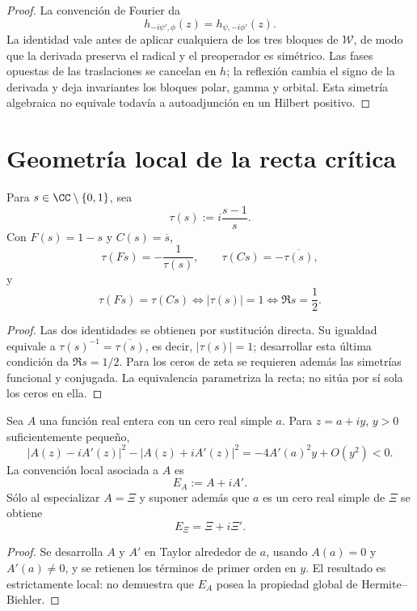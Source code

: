 \begin{proof}
La convención de Fourier da
\[
 h_{-i\psi',\phi}(z)=h_{\psi,-i\phi'}(z).
\]
La identidad vale antes de aplicar cualquiera de los tres bloques de
\(\mathcal W\), de modo que la derivada preserva el radical y el
preoperador es simétrico. Las fases opuestas de las traslaciones se cancelan
en \(h\); la reflexión cambia el signo de la derivada y deja invariantes los
bloques polar, gamma y orbital. Esta simetría algebraica no equivale todavía
a autoadjunción en un Hilbert positivo.
\end{proof}

\section{Geometría local de la recta crítica}

\begin{lemma}
\label{pf84:RH-01}
Para \(s\in\CC\setminus\{0,1\}\), sea
\[
 \tau(s):=i\frac{s-1}{s}.
\]
Con \(F(s)=1-s\) y \(C(s)=\overline s\),
\[
 \tau(Fs)=-\frac1{\tau(s)},
 \qquad
 \tau(Cs)=-\overline{\tau(s)},
\]
y
\[
 \tau(Fs)=\tau(Cs)
 \iff |\tau(s)|=1
 \iff \Re s=\frac12.
\]
\end{lemma}

\begin{proof}
Las dos identidades se obtienen por sustitución directa. Su igualdad
equivale a \(\tau(s)^{-1}=\overline{\tau(s)}\), es decir,
\(|\tau(s)|=1\); desarrollar esta última condición da
\(\Re s=1/2\). Para los ceros de zeta se requieren además las simetrías
funcional y conjugada. La equivalencia parametriza la recta; no sitúa por sí
sola los ceros en ella.
\end{proof}

\begin{lemma}
\label{pf84:RH-04}
Sea \(A\) una función real entera con un cero real simple \(a\). Para
\(z=a+iy\), \(y>0\) suficientemente pequeño,
\[
|A(z)-iA'(z)|^2-|A(z)+iA'(z)|^2
 =-4A'(a)^2y+O(y^2)<0.
\]
La convención local asociada a \(A\) es
\[
 E_A:=A+iA'.
\]
Sólo al especializar \(A=\Xi\) y suponer además que \(a\) es un cero real
simple de \(\Xi\) se obtiene
\[
 E_\Xi=\Xi+i\Xi'.
\]
\end{lemma}

\begin{proof}
Se desarrolla \(A\) y \(A'\) en Taylor alrededor de \(a\), usando
\(A(a)=0\) y \(A'(a)\ne0\), y se retienen los términos de primer orden en
\(y\). El resultado es estrictamente local: no demuestra que \(E_A\) posea la
propiedad global de Hermite--Biehler.
\end{proof}

